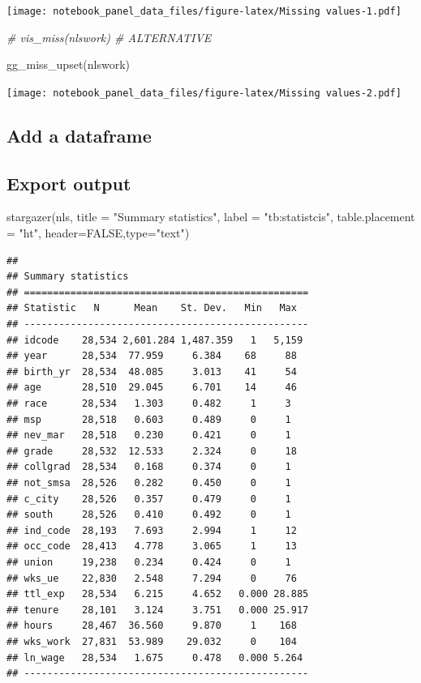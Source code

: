 \documentclass[
]{article}
\newenvironment{Shaded}{\begin{snugshade}}{\end{snugshade}}
\newcommand{\AttributeTok}[1]{\textcolor[rgb]{0.77,0.63,0.00}{#1}}
\newcommand{\CommentTok}[1]{\textcolor[rgb]{0.56,0.35,0.01}{\textit{#1}}}
\newcommand{\ConstantTok}[1]{\textcolor[rgb]{0.00,0.00,0.00}{#1}}
\newcommand{\FunctionTok}[1]{\textcolor[rgb]{0.00,0.00,0.00}{#1}}
\newcommand{\NormalTok}[1]{#1}
\newcommand{\StringTok}[1]{\textcolor[rgb]{0.31,0.60,0.02}{#1}}
\begin{document}
\texttt{[image: notebook\_panel\_data\_files/figure-latex/Missing values-1.pdf]}

\begin{Shaded}
\begin{Highlighting}[]
\CommentTok{\# vis\_miss(nlswork) \# ALTERNATIVE}

  \FunctionTok{gg\_miss\_upset}\NormalTok{(nlswork)}
\end{Highlighting}
\end{Shaded}

\texttt{[image: notebook\_panel\_data\_files/figure-latex/Missing values-2.pdf]}

\hypertarget{add-a-dataframe}{%
\subsection{Add a dataframe}\label{add-a-dataframe}}

\hypertarget{export-output}{%
\subsection{Export output}\label{export-output}}

\begin{Shaded}
\begin{Highlighting}[]
  \FunctionTok{stargazer}\NormalTok{(nls,}
            \AttributeTok{title =} \StringTok{"Summary statistics"}\NormalTok{,}
            \AttributeTok{label =} \StringTok{"tb:statistcis"}\NormalTok{,}
            \AttributeTok{table.placement =} \StringTok{"ht"}\NormalTok{,}
            \AttributeTok{header=}\ConstantTok{FALSE}\NormalTok{,}\AttributeTok{type=}\StringTok{"text"}\NormalTok{)}
\end{Highlighting}
\end{Shaded}

\begin{verbatim}
## 
## Summary statistics
## =================================================
## Statistic   N      Mean    St. Dev.   Min   Max  
## -------------------------------------------------
## idcode    28,534 2,601.284 1,487.359   1   5,159 
## year      28,534  77.959     6.384    68     88  
## birth_yr  28,534  48.085     3.013    41     54  
## age       28,510  29.045     6.701    14     46  
## race      28,534   1.303     0.482     1     3   
## msp       28,518   0.603     0.489     0     1   
## nev_mar   28,518   0.230     0.421     0     1   
## grade     28,532  12.533     2.324     0     18  
## collgrad  28,534   0.168     0.374     0     1   
## not_smsa  28,526   0.282     0.450     0     1   
## c_city    28,526   0.357     0.479     0     1   
## south     28,526   0.410     0.492     0     1   
## ind_code  28,193   7.693     2.994     1     12  
## occ_code  28,413   4.778     3.065     1     13  
## union     19,238   0.234     0.424     0     1   
## wks_ue    22,830   2.548     7.294     0     76  
## ttl_exp   28,534   6.215     4.652   0.000 28.885
## tenure    28,101   3.124     3.751   0.000 25.917
## hours     28,467  36.560     9.870     1    168  
## wks_work  27,831  53.989    29.032     0    104  
## ln_wage   28,534   1.675     0.478   0.000 5.264 
## -------------------------------------------------
\end{verbatim}
\end{document}
